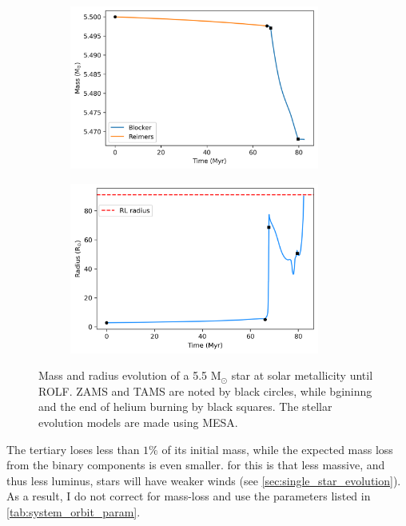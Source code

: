 \begin{figure}[H]
    \centering
    \begin{subfigure}{.5\textwidth}
    \centering
    \includegraphics[width=0.9\textwidth]{Thesis/graphs/giant_1-1mass_loss.pdf}
    \label{fig:mass_loss}
    \end{subfigure}%
    \begin{subfigure}{.5\textwidth}
    \centering
    \includegraphics[width=0.9\textwidth]{Thesis/graphs/giant_1-1radius.pdf}
    \label{fig:radius_profile}
    \end{subfigure}
    \caption{ Mass and radius evolution of a 5.5 M$_{\odot}$ star at solar metallicity until ROLF. ZAMS and TAMS are noted by black circles, while bgininng and the end of helium burning by black squares. The stellar evolution models are made using MESA\citep{paxton2010modules,paxton2013modules,paxton2015modules,paxton2019modules}.}
\end{figure}

The tertiary loses less than $1\%$ of its 
initial mass, while the expected mass loss from the binary components is even smaller. for this is that less massive, and thus less luminus, stars will have weaker winds (see \cref{sec:single_star_evolution}). As a result, I do not correct for mass-loss and use the parameters listed in  \cref{tab:system_orbit_param}.

